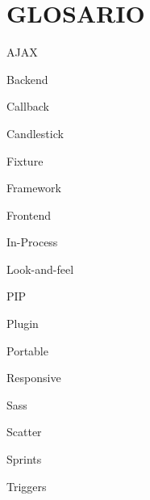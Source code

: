 \chapter*{GLOSARIO}

\begin{description}
    \item AJAX
    \item Backend
    \item Callback
    \item Candlestick
    \item Fixture
    \item Framework
    \item Frontend
    \item In-Process
    \item Look-and-feel
    \item PIP
    \item Plugin
    \item Portable
    \item Responsive
    \item Sass
    \item Scatter
    \item Sprints
    \item Triggers

\end{description}

\clearpage
